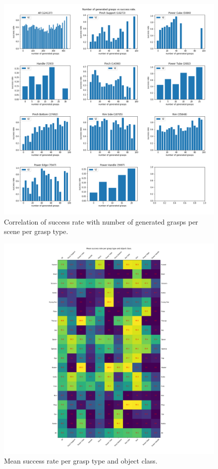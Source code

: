 \begin{figure}
\centering
\includegraphics[width=0.8\columnwidth]{images/post-analysis/[10] number_of_generated_grasps_vs_success_rate.png}
\caption{Correlation of success rate with number of generated grasps per scene per grasp type.}
\label{fig:post10}
\end{figure}

\begin{figure}
\centering
\includegraphics[width=0.8\columnwidth]{images/post-analysis/[12] mean_success_rate_per_grasp_type_and_object_class.png}
\caption{Mean success rate per grasp type and object class.}
\label{fig:post12}
\end{figure}

